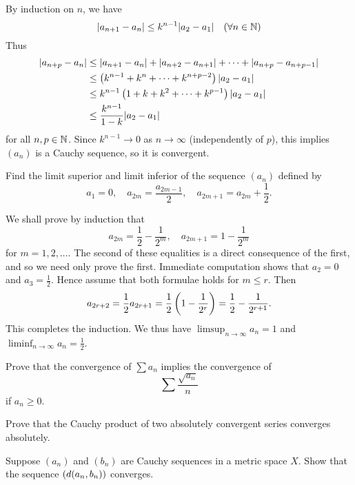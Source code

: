 \begin{solution}
By induction on $n$, we have
\[|a_{n+1}-a_n|\le k^{n-1}|a_2-a_1|\quad(\forall n\in\mathbb N)\]
Thus
\begin{align*}
|a_{n+p}-a_{n}|&\le|a_{n+1}-a_{n}|+|a_{n+2}-a_{n+1}|+\cdots+|a_{n+p}-a_{n+p-1}|\\ 
&\le\left(k^{n-1}+k^{n}+\cdots+k^{n+p-2}\right)|a_{2}-a_{1}|\\ 
&\le k^{n-1}\left(1+k+k^{2}+\cdots+k^{p-1}\right)|a_{2}-a_{1}|\\ 
&\le\frac{k^{n-1}}{1-k}|a_{2}-a_{1}|
\end{align*}
for all $n,p\in\mathbb N$. Since $k^{n-1}\to0$ as $n\to\infty$ (independently of $p$), this implies $(a_n)$ is a Cauchy sequence, so it is convergent.
\end{solution}

\begin{exercise}
Find the limit superior and limit inferior of the sequence $(a_n)$ defined by
\[a_1=0,\quad a_{2m}=\frac{a_{2m-1}}{2},\quad a_{2m+1}=a_{2m}+\frac{1}{2}.\]
\end{exercise}

\begin{solution}
We shall prove by induction that
\[a_{2m}=\frac{1}{2}-\frac{1}{2^m},\quad a_{2m+1}=1-\frac{1}{2^m}\]
for $m=1,2,\dots$. The second of these equalities is a direct consequence of the first, and so we need only prove the first. Immediate computation shows that $a_2=0$ and $a_3=\frac{1}{2}$. Hence assume that both formulae holds for $m\le r$. Then
\[a_{2r+2}=\frac{1}{2}a_{2r+1}=\frac{1}{2}\left(1-\frac{1}{2^r}\right)=\frac{1}{2}-\frac{1}{2^{r+1}}.\]
This completes the induction. We thus have $\displaystyle\limsup_{n\to\infty}a_n=1$ and $\displaystyle\liminf_{n\to\infty}a_n=\frac{1}{2}$.
\end{solution}

\begin{exercise}
Prove that the convergence of $\sum a_n$ implies the convergence of
\[\sum\frac{\sqrt{a_n}}{n}\]
if $a_n\ge0$.
\end{exercise}

\begin{exercise}
Prove that the Cauchy product of two absolutely convergent series converges absolutely.
\end{exercise}

\begin{exercise}
Suppose $(a_n)$ and $(b_n)$ are Cauchy sequences in a metric space $X$. Show that the sequence $\left(d(a_n,b_n)\right)$ converges.
\end{exercise}

